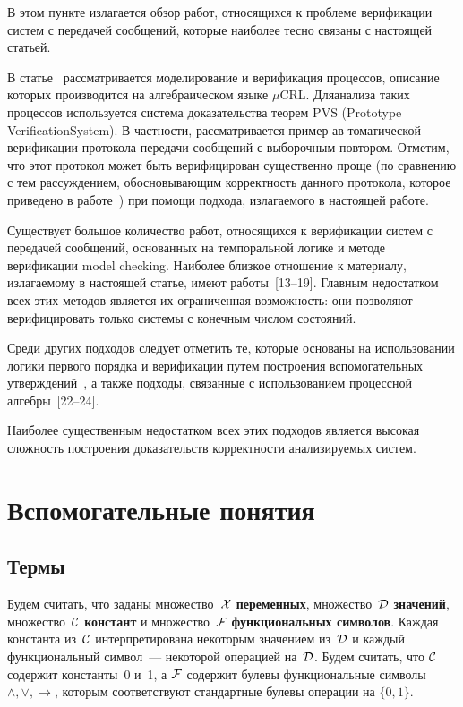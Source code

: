 \begin{multicols}{2}
В этом пункте  излагается обзор работ, относящихся
к проблеме верификации систем с  передачей сообщений,
которые наиболее тесно связаны с настоящей статьей.

В статье~\cite{9-mir} рассматривается моделирование и верификация
процессов, описание которых производится на алгебраическом языке  $\mu$CRL.
Для\linebreak анализа таких процессов используется система доказательства теорем
PVS (Prototype Verification\linebreak System).
В частности, рассматривается пример ав-\linebreak томатической
верификации протокола передачи сообщений  с выборочным повтором.
Отметим, что этот протокол может быть верифицирован
существенно проще (по сравнению с тем рас\-суж\-де\-ни\-ем,
обосновывающим корректность
данного протокола, которое приведено в работе~\cite{9-mir})
при помощи подхода, излагаемого в настоящей работе.

Существует большое количество работ, отно\-сящихся к верификации систем с передачей
со\-об\-щений, основанных на темпоральной логике и методе верификации model checking.
Наиболее близкое отношение к материалу, излагаемому в
настоящей статье, имеют работы~[13--19].
Главным недостатком всех этих методов является их ограниченная
возможность: они позволяют верифицировать только системы с конечным числом состояний.

Среди других подходов следует отметить те, которые основаны на использовании
логики первого порядка и верификации путем построения вспомогательных
утверждений~\cite{21-mir, 20-mir},
а также подходы, связанные с использованием
процессной ал\-геб\-ры~[22--24].

Наиболее существенным недостатком всех этих подходов является высокая сложность
по\-стро\-ения доказательств корректности анализируемых сис\-тем.

\section{Вспомогательные понятия}

\subsection{Термы}

Будем считать, что заданы множество~${\cal X}$  {\bf переменных},
множество~${\cal D}$  {\bf значений},
множество~${\cal C}$  {\bf констант} и множество~${\cal F}$  {\bf функциональных
символов}. Каждая константа из~${\cal C}$ интерпретирована
некоторым значением из~${\cal D}$ и каждый функциональный
символ~--- некоторой операцией на~${\cal D}$.
Будем считать, что ${\cal C}$ содержит константы~0 и~1, а
${\cal F}$ содержит булевы функциональные
символы  $\wedge,\vee,\to$, которым соответствуют
стандартные булевы операции на $\{0,1\}$.


\end{multicols}
